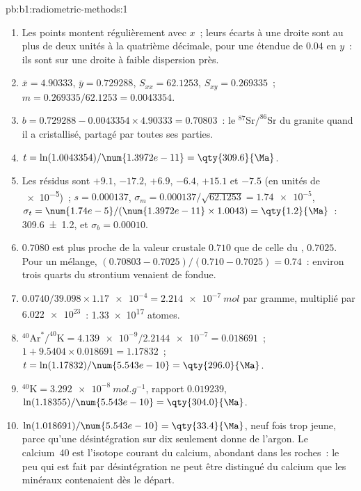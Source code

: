 \begin{solution}{pb:b1:radiometric-methods:1}
\begin{enumerate}
  \item Les points montent régulièrement avec $x$~; leurs écarts à une droite sont au plus
        de deux unités à la quatrième décimale, pour une étendue de $0.04$ en $y$~: ils sont sur une
        droite à faible dispersion près.
  \item $\bar x = 4.90333$, $\bar y = 0.729288$, $S_{xx} = 62.1253$, $S_{xy} =
        0.269335$~; $m = 0.269335/62.1253 = 0.0043354$.
  \item $b = 0.729288 - 0.0043354 \times 4.90333 = 0.70803$~: le
        $^{87}\mathrm{Sr}/^{86}\mathrm{Sr}$ du granite quand il a cristallisé,
        partagé par toutes ses parties.
  \item $t = \ln(1.0043354)/\num{1.3972e-11} = \qty{309.6}{\Ma}$.
  \item Les résidus sont $+9.1$, $-17.2$, $+6.9$, $-6.4$, $+15.1$ et $-7.5$ (en
        unités de \num{e-5})~; $s = 0.000137$, $\sigma_m = 0.000137/\sqrt{62.1253} =
        \num{1.74e-5}$, $\sigma_t = \num{1.74e-5}/(\num{1.3972e-11} \times 1.0043)
        = \qty{1.2}{\Ma}$~: \qty[uncertainty-mode=separate]{309.6(12)}{\Ma}, et
        $\sigma_b = 0.00010$.
  \item $0.7080$ est plus proche de la valeur crustale $0.710$ que de celle du , $0.7025$.
        Pour un mélange, $(0.70803 - 0.7025)/(0.710 - 0.7025) = 0.74$~: environ trois
        quarts du strontium venaient de  fondue.
  \item $0.0740/39.098 \times \num{1.17e-4} = \qty{2.214e-7}{mol}$ par gramme,
        multiplié par $\num{6.022e23}$~: \num{1.33e17} atomes.
  \item $^{40}\mathrm{Ar}^*/^{40}\mathrm{K} = \num{4.139e-9}/\num{2.2144e-7} =
        0.018691$~; $1 + 9.5404 \times 0.018691 = 1.17832$~; $t =
        \ln(1.17832)/\num{5.543e-10} = \qty{296.0}{\Ma}$.
  \item $^{40}\mathrm{K} = \qty{3.292e-8}{mol.g^{-1}}$, rapport $0.019239$,
        $\ln(1.18355)/\num{5.543e-10} = \qty{304.0}{\Ma}$.
  \item $\ln(1.018691)/\num{5.543e-10} = \qty{33.4}{\Ma}$, neuf fois trop jeune,
        parce qu'une désintégration sur dix seulement donne de l'argon. Le calcium~40 est
        l'isotope courant du calcium, abondant dans les roches~: le peu qui est fait par désintégration ne peut
        être distingué du calcium que les minéraux contenaient dès le départ.

\end{enumerate}
\end{solution}
